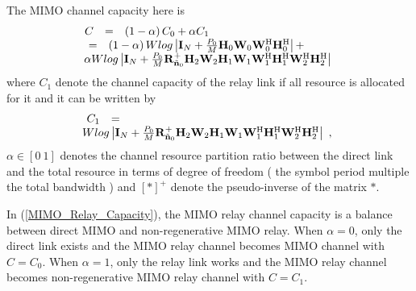 \documentclass[a4paper,10pt,fleqn, twocolumn]{IEEEtran}
\newcommand{\bH}{{\bf H}}
\newcommand{\bn}{{\bf n}}
\newcommand{\bI}{{\bf I}}
\newcommand{\bR}{{\bf R}}
\newcommand{\bW}{{\bf W}}
\begin{document}
The MIMO channel capacity here is
\begin{equation}\hspace{-0.05in}
\begin{array}{rcl}
C&=& \left(1-\alpha\right)C_{0} +  \alpha C_{1}\\
&\hspace{-0.4in}=&\hspace{-0.2in}\left(1-\alpha\right)
W\mbox{log}\left|\bI_{N}+\frac{P_{0}}{M}\bH_{0}\bW_{0}\bW_{0}^{\rm
H}\bH_{0}^{\rm H}\right|+\\
&&\hspace{-0.50in}\alpha
W\mbox{log}\left|\bI_{N}+\frac{P_{0}}{M}\bR_{\tilde{\bn}_{0}}^{+}\bH_{2}\bW_{2}\bH_{1}\bW_{1}\bW_{1}^{\rm
H}\bH_{1}^{\rm H}\bW_{2}^{\rm H}\bH_{2}^{\rm H}\right|
\end{array}\label{MIMO_Relay_Capacity}
\end{equation}
\noindent where $C_{1}$ denote the channel capacity of the relay
link if all resource is allocated for it and it can be written by
\begin{equation}\hspace{-0.0in}
\begin{array}{rcl}
C_{1}&=&\\
&&\hspace{-0.60in}W\mbox{log}\left|\bI_{N}+\frac{P_{0}}{M}\bR_{\tilde{\bn}_{0}}^{+}\bH_{2}\bW_{2}\bH_{1}\bW_{1}\bW_{1}^{\rm
H}\bH_{1}^{\rm H}\bW_{2}^{\rm H}\bH_{2}^{\rm H}\right|\ ,
\end{array}
\end{equation}
\noindent$\alpha\in\left[0\ 1\right]$ denotes the channel resource
partition ratio between the direct link and the total resource in
terms of degree of freedom ( the symbol period multiple the total
bandwidth ) and $\left[\ast\right]^{+}$ denote the pseudo-inverse
of the matrix $\ast$.

In (\ref{MIMO_Relay_Capacity}), the MIMO relay channel capacity is
a balance between direct MIMO and non-regenerative MIMO relay.
When $\alpha=0$, only the direct link exists and the MIMO relay
channel becomes MIMO channel with $C=C_{0}$. When $\alpha=1$, only
the relay link works and the MIMO relay channel becomes
non-regenerative MIMO relay channel with $C=C_{1}$.
\end{document}
